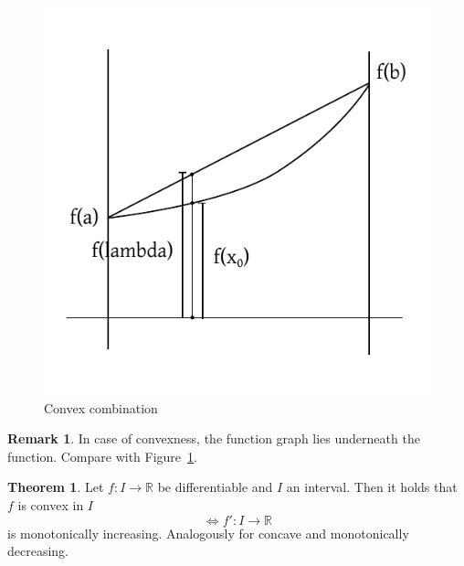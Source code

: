\documentclass[a4paper,landscape,twocolumn]{article}
\theoremstyle{definition}
\newtheorem{theorem}{Theorem}
\newtheorem{rem}{Remark}
\begin{document}
\begin{figure}[!h]
  \begin{center}
    \includegraphics{img/convex_combination.pdf}
    \caption{Convex combination}
    \label{img:convex-combination}
  \end{center}
\end{figure}
%
\begin{rem}
  In case of convexness, the function graph lies underneath the function.
  Compare with Figure~\ref{img:convex-combination}.
\end{rem}
%
\begin{theorem}
  Let $f: I \to \mathbb R$ be differentiable and $I$ an interval.
  Then it holds that $f$ is convex in $I$
  \[ \Leftrightarrow f': I \to \mathbb R \]
  is monotonically increasing. Analogously for concave and monotonically decreasing.
\end{theorem}
%
\end{document}
